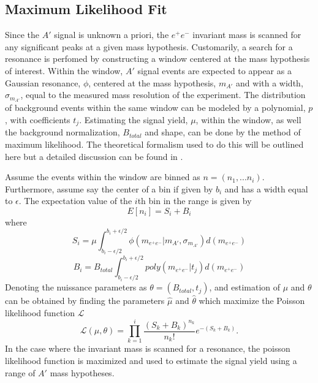 \subsection{Maximum Likelihood Fit}

Since the $A'$ signal is unknown a priori, the 
$e^+e^-$ invariant mass is scanned for any significant peaks at a given mass 
hypothesis.
Customarily, a search for a resonance is perfomed by constructing a
window centered at the mass hypothesis of interest.  Within the window, $A'$ 
signal events are expected to appear as a Gaussian resonance, $\phi$, centered at
the mass hypothesis, $m_{A'}$ and with a width, $\sigma_{m_{A'}}$, equal to the
 measured mass resolution of
the experiment.  The distribution of background events within the same window
can be modeled by a polynomial, $p$, with coefficients $t_j$.  Estimating the 
signal yield, $\mu$, within
the window, as well the background normalization, $B_{total}$ and shape, can be
done by the method of maximum likelihood.  The theoretical formalism
used to do this will be outlined here but a detailed discussion can be found in
\cite{Cowan:2010js}.

Assume the events within the window are binned as $n = (n_{1}, ... n_{i})$.
Furthermore, assume say the center of a bin if given by $b_i$ and has a width
equal to $\epsilon$. 
The expectation value of the $i$th bin in the range is given by 
\begin{equation}
    E[n_i] = S_{i} + B_{i}
\end{equation}
where 
\begin{equation}
    S_{i} = \mu \int_{b_i - \epsilon/2}^{b_i + \epsilon/2} \phi(m_{e^+e^-} | m_{A'}, \sigma_{m_{A'}}) d (m_{e^+e^-})
\end{equation} 
\begin{equation}
    B_{i} = B_{total} \int_{b_i - \epsilon/2}^{b_i + \epsilon/2} poly(m_{e^+e^-} | t_{j}) d (m_{e^+e^-})
\end{equation}
Denoting the nuissance parameters as $\theta = (B_{total},  t_{j})$, and estimation
of $\mu$ and $\theta$ can be obtained by finding the parameters $\hat{\mu}$ and
$\hat{\theta}$ which maximize the Poisson likelihood function $\mathcal{L}$
\begin{equation}
    \mathcal{L}(\mu, \theta) = \prod_{k=1}^{i} \frac{(S_{k} + B_{k})^{n_k}}{n_{k}!} e^{-(S_{k} + B_{k})}. 
\end{equation}
In the case where the invariant mass is scanned for a resonance, the poisson 
likelihood function is maximized and used to estimate the signal yield using a
range of $A'$ mass hypotheses. 

